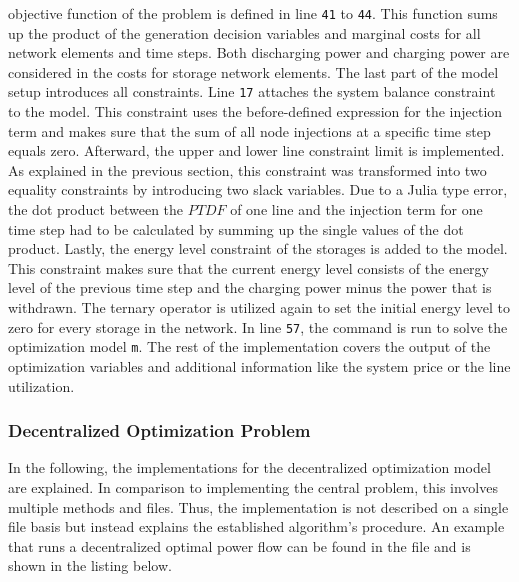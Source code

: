 objective function of the problem is defined in line \texttt{41} to \texttt{44}. This function sums up the product of the generation decision variables and marginal costs for all network elements and time steps. Both discharging power and charging power are considered in the costs for storage network elements. The last part of the model setup introduces all constraints. Line \texttt{17} attaches the system balance constraint to the model. This constraint uses the before-defined expression for the injection term and makes sure that the sum of all node injections at a specific time step equals zero. Afterward, the upper and lower line constraint limit is implemented. As explained in the previous section, this constraint was transformed into two equality constraints by introducing two slack variables. Due to a Julia type error, the dot product between the $PTDF$ of one line and the injection term for one time step had to be calculated by summing up the single values of the dot product. Lastly, the energy level constraint of the storages is added to the model. This constraint makes sure that the current energy level consists of the energy level of the previous time step and the charging power minus the power that is withdrawn. The ternary operator is utilized again to set the initial energy level to zero for every storage in the network. In line \texttt{57}, the command is run to solve the optimization model \lstinline[language=julia]{m}. The rest of the implementation covers the output of the optimization variables and additional information like the system price or the line utilization.


\subsubsection{Decentralized Optimization Problem}

In the following, the implementations for the decentralized optimization model are explained. In comparison to implementing the central problem, this involves multiple methods and files. Thus, the implementation is not described on a single file basis but instead explains the established algorithm's procedure. An example that runs a decentralized optimal power flow can be found in the file  and is shown in the listing below.



